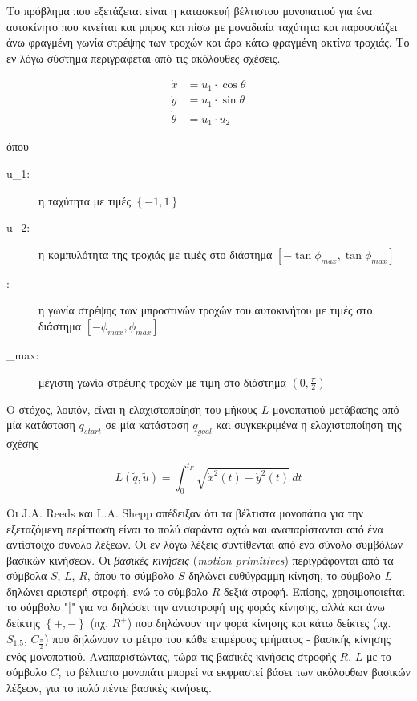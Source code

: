 \bigskip
Το πρόβλημα που εξετάζεται είναι η κατασκευή βέλτιστου μονοπατιού για ένα αυτοκίνητο που κινείται και μπρος και πίσω με μοναδιαία ταχύτητα και παρουσιάζει άνω φραγμένη γωνία στρέψης των τροχών και άρα κάτω φραγμένη ακτίνα τροχιάς. Το εν λόγω σύστημα περιγράφεται από τις ακόλουθες σχέσεις.

\begin{align}
	\dot x &= u_1 \cdot \cos\theta\\
	\dot y &= u_1 \cdot \sin\theta\\
	\dot\theta &= u_1 \cdot u_2
\end{align}

\noindent όπου
\begin{description}
	\item[u_1:] η ταχύτητα με τιμές $\left\{-1,1\right\}$
	\item[u_2:] η καμπυλότητα της τροχιάς με τιμές στο διάστημα $\left[-\tan\phi_{max}, \tan\phi_{max}\right]$
	\item[\phi:] η γωνία στρέψης των μπροστινών τροχών του αυτοκινήτου με τιμές στο\\ διάστημα $\left[-\phi_{max}, \phi_{max}\right]$
	\item[\phi_{max}:] μέγιστη γωνία στρέψης τροχών με τιμή στο διάστημα $(0, \frac{\pi}{2})$
\end{description}

\bigskip
Ο στόχος, λοιπόν, είναι η ελαχιστοποίηση του μήκους $L$ μονοπατιού μετάβασης από μία κατάσταση $q_{start}$ σε μία κατάσταση $q_{goal}$ και συγκεκριμένα η ελαχιστοποίηση της σχέσης

\begin{equation}
	L(\widetilde q,\widetilde u) = \int_0^{t_F} \sqrt{\dot x^2 (t) + \dot y^2 (t)}\, dt
\end{equation}

\bigskip
Οι J.A. Reeds και L.A. Shepp απέδειξαν ότι τα βέλτιστα μονοπάτια για την εξεταζόμενη περίπτωση είναι το πολύ σαράντα οχτώ και αναπαρίστανται από ένα αντίστοιχο σύνολο λέξεων. Οι εν λόγω λέξεις συντίθενται από ένα σύνολο συμβόλων βασικών κινήσεων. Οι \textit{βασικές κινήσεις} (\textit{motion primitives}) περιγράφονται από τα σύμβολα $S$, $L$, $R$, όπου το σύμβολο $S$ δηλώνει ευθύγραμμη κίνηση, το σύμβολο $L$ δηλώνει αριστερή στροφή, ενώ το σύμβολο $R$ δεξιά στροφή. Επίσης, χρησιμοποιείται το σύμβολο "|" για να δηλώσει την αντιστροφή της φοράς κίνησης, αλλά και άνω δείκτης $\left\{+,-\right\}$ (πχ. $R^+$) που δηλώνουν την φορά κίνησης και κάτω δείκτες (πχ. $S_{1.5}$, $C_\frac{\pi}{2}$) που δηλώνουν το μέτρο του κάθε επιμέρους τμήματος - βασικής κίνησης ενός μονοπατιού. Αναπαριστώντας, τώρα τις βασικές κινήσεις στροφής $R$, $L$ με το σύμβολο $C$, το βέλτιστο μονοπάτι μπορεί να εκφραστεί βάσει των ακόλουθων βασικών λέξεων, για το πολύ πέντε βασικές κινήσεις.

